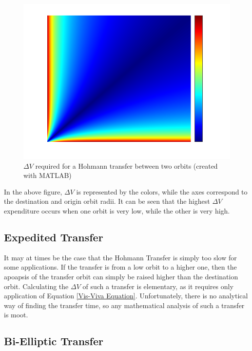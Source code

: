 \documentclass{article}
\begin{document}
\begin{figure}[H]
    \centering
    \includegraphics[scale=0.5]{DeltaVHeatmap.png}
    \caption{$\Delta V$ required for a Hohmann transfer between two orbits (created with MATLAB)}\label{fig:Delta V Heatmap}
\end{figure}

In the above figure, $\Delta V$ is represented by the colors, while the axes correspond to the destination and origin orbit radii. It can be seen that the highest $\Delta V$ expenditure occurs when one orbit is very low, while the other is very high.

\bigskip\bigskip
\subsection{Expedited Transfer}

It may at times be the case that the Hohmann Transfer is simply too slow for some applications. If the transfer is from a low orbit to a higher one, then the apoapsis of the transfer orbit can simply be raised higher than the destination orbit. Calculating the $\Delta V$ of such a transfer is elementary, as it requires only application of Equation \eqref{Vis-Viva Equation}. Unfortunately, there is no analytical way of finding the transfer time, so any mathematical analysis of such a transfer is moot.

\bigskip\bigskip
\subsection{Bi-Elliptic Transfer}
\end{document}
